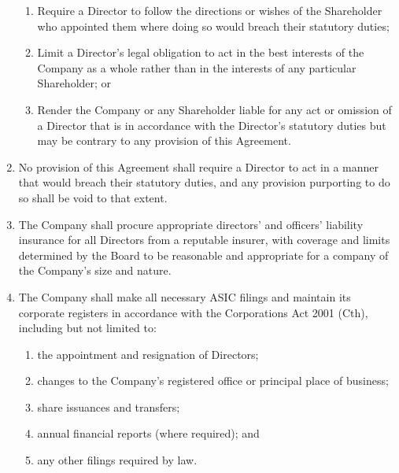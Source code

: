 \begin{enumerate}[label=(\alph*)]
\begin{enumerate}[label=(\roman*)]
    \item Require a Director to follow the directions or wishes of the Shareholder who appointed them where doing so would breach their statutory duties;
    \item Limit a Director's legal obligation to act in the best interests of the Company as a whole rather than in the interests of any particular Shareholder; or
    \item Render the Company or any Shareholder liable for any act or omission of a Director that is in accordance with the Director's statutory duties but may be contrary to any provision of this Agreement.
    \end{enumerate}
\item No provision of this Agreement shall require a Director to act in a manner that would breach their statutory duties, and any provision purporting to do so shall be void to that extent.
\item The Company shall procure appropriate directors' and officers' liability insurance for all Directors from a reputable insurer, with coverage and limits determined by the Board to be reasonable and appropriate for a company of the Company's size and nature.
\item The Company shall make all necessary ASIC filings and maintain its corporate registers in accordance with the Corporations Act 2001 (Cth), including but not limited to:
    \begin{enumerate}[label=(\roman*)]
    \item the appointment and resignation of Directors;
    \item changes to the Company's registered office or principal place of business;
    \item share issuances and transfers;
    \item annual financial reports (where required); and
    \item any other filings required by law.
    \end{enumerate}
\end{enumerate} 

